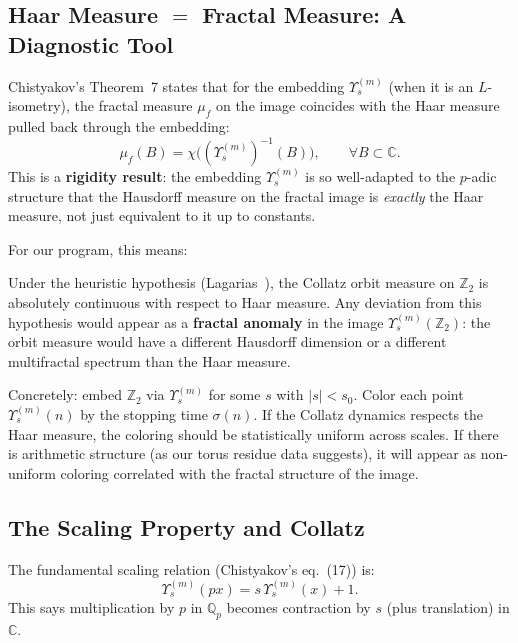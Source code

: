 \documentclass[11pt,a4paper]{article}
\newcommand{\Z}{\mathbb{Z}}
\newcommand{\C}{\mathbb{C}}
\newcommand{\Q}{\mathbb{Q}}
\newcommand{\Qp}{\Q_p}
\theoremstyle{plain}
\theoremstyle{definition}
\begin{document}
\subsection{Haar Measure $=$ Fractal Measure: A Diagnostic Tool}\label{sec:haar}

Chistyakov's Theorem~7 states that for the embedding $\Upsilon_s^{(m)}$ (when it is an $L$-isometry), the fractal measure $\mu_f$ on the image coincides with the Haar measure pulled back through the embedding:
\begin{equation}
    \mu_f(B) = \chi\bigl((\Upsilon_s^{(m)})^{-1}(B)\bigr), \qquad \forall B \subset \C.
\end{equation}
This is a \textbf{rigidity result}: the embedding $\Upsilon_s^{(m)}$ is so well-adapted to the $p$-adic structure that the Hausdorff measure on the fractal image is \emph{exactly} the Haar measure, not just equivalent to it up to constants.

For our program, this means:

\begin{keyinsight}
    Under the heuristic hypothesis (Lagarias~\cite{Lagarias1985}), the Collatz orbit measure on $\Z_2$ is absolutely continuous with respect to Haar measure. Any deviation from this hypothesis would appear as a \textbf{fractal anomaly} in the image $\Upsilon_s^{(m)}(\Z_2)$: the orbit measure would have a different Hausdorff dimension or a different multifractal spectrum than the Haar measure.

    Concretely: embed $\Z_2$ via $\Upsilon_s^{(m)}$ for some $s$ with $|s| < s_0$. Color each point $\Upsilon_s^{(m)}(n)$ by the stopping time $\sigma(n)$. If the Collatz dynamics respects the Haar measure, the coloring should be statistically uniform across scales. If there is arithmetic structure (as our torus residue data suggests), it will appear as non-uniform coloring correlated with the fractal structure of the image.
\end{keyinsight}


\subsection{The Scaling Property and Collatz}\label{sec:scaling}

The fundamental scaling relation (Chistyakov's eq.~(17)) is:
\begin{equation}\label{eq:scaling}
    \Upsilon_s^{(m)}(px) = s\, \Upsilon_s^{(m)}(x) + 1.
\end{equation}
This says multiplication by $p$ in $\Qp$ becomes contraction by $s$ (plus translation) in $\C$.
\end{document}
